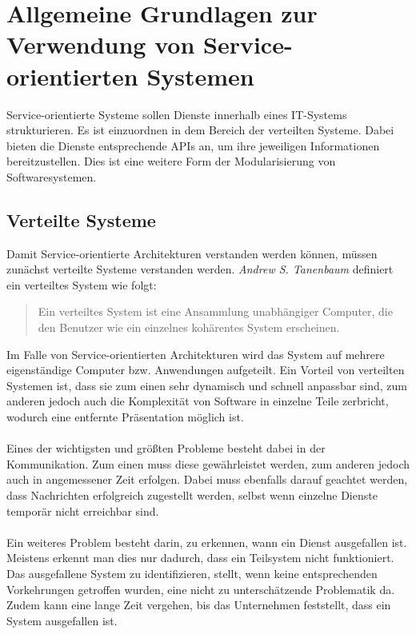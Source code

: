 \chapter[Grundlagen von Service-orientierten Systemen]{Allgemeine Grundlagen zur Verwendung von Service-orientierten Systemen}
\label{chap:Grundlagen}
Service-orientierte Systeme sollen Dienste innerhalb eines IT-Systems strukturieren. Es ist einzuordnen in dem Bereich der verteilten Systeme. Dabei bieten die Dienste entsprechende APIs an, um ihre jeweiligen Informationen bereitzustellen. Dies ist eine weitere Form der Modularisierung von Softwaresystemen.

\section{Verteilte Systeme}
\label{sec:VerteilteAnwendungen}
Damit Service-orientierte Architekturen verstanden werden können, müssen zunächst verteilte Systeme verstanden werden. \textit{Andrew S. Tanenbaum} definiert ein verteiltes System wie folgt:
\begin{quotation}
    \frqq Ein verteiltes System ist eine Ansammlung unabhängiger Computer, die den Benutzer wie ein einzelnes kohärentes System erscheinen.\flqq\cite[S. 19]{tanenbaum:VerteilteSysteme}
\end{quotation}

Im Falle von Service-orientierten Architekturen wird das System auf mehrere eigenständige Computer bzw. Anwendungen aufgeteilt. Ein Vorteil von verteilten Systemen ist, dass sie zum einen sehr dynamisch und schnell anpassbar sind, zum anderen jedoch auch die Komplexität von Software in einzelne Teile zerbricht, wodurch eine entfernte Präsentation möglich ist.
\\\\
Eines der wichtigsten und größten Probleme besteht dabei in der Kommunikation. Zum einen muss diese gewährleistet werden, zum anderen jedoch auch in angemessener Zeit erfolgen. Dabei muss ebenfalls darauf geachtet werden, dass Nachrichten erfolgreich zugestellt werden, selbst wenn einzelne Dienste temporär nicht erreichbar sind.
\\\\
Ein weiteres Problem besteht darin, zu erkennen, wann ein Dienst ausgefallen ist. Meistens erkennt man dies nur dadurch, dass ein Teilsystem nicht funktioniert. Das ausgefallene System zu identifizieren, stellt, wenn keine entsprechenden Vorkehrungen getroffen wurden, eine nicht zu unterschätzende Problematik da. Zudem kann eine lange Zeit vergehen, bis das Unternehmen feststellt, dass ein System ausgefallen ist. 

